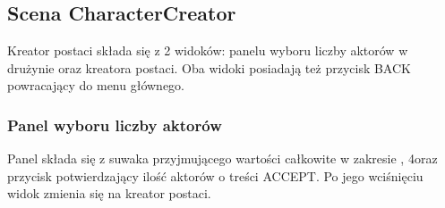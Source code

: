 \documentclass{SGGW-thesis}
\begin{document}
\subsection{Scena CharacterCreator}
Kreator postaci składa się z 2 widoków: panelu wyboru liczby aktorów w drużynie oraz kreatora postaci. Oba widoki posiadają też przycisk BACK powracający do menu głównego.


\subsubsection{Panel wyboru liczby aktorów}
Panel składa się z suwaka przyjmującego wartości całkowite w zakresie , 4\textrangle oraz przycisk potwierdzający ilość aktorów o treści ACCEPT. Po jego wciśnięciu widok zmienia się na kreator postaci.
\end{document}
